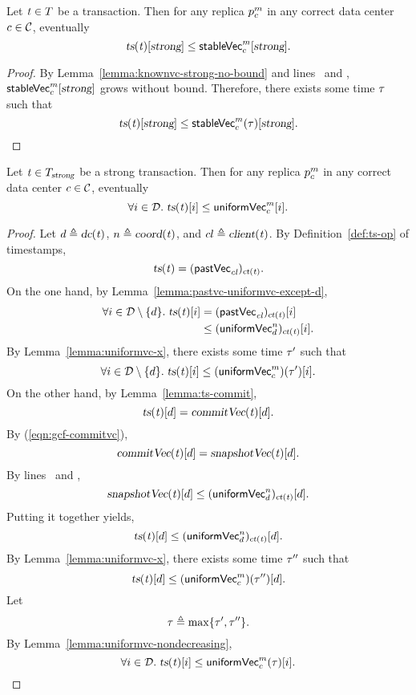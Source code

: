 \begin{applemma} \label{lemma:uniformity-strong}
  Let $\mathit{t} \in T$ be a transaction.
  Then for any replica $p^{m}_{c}$
  in any correct data center $c \in \mathcal{C}$, eventually
  \[
    \textsl{ts}(\mathit{t})[\textsl{strong}] \le {\sf stableVec}^{m}_{c}[\textsl{strong}].
  \]
\end{applemma}

\begin{proof} \label{proof:uniformity-strong}
  By Lemma~\ref{lemma:knownvc-strong-no-bound}
  and lines~\code{\ref{alg:unistore-clock}}{\ref{line:bcast-call-knownvclocal}}
  and \code{\ref{alg:unistore-clock}}{\ref{line:knownvclocal-stablevc-strong}},
  ${\sf stableVec}^{m}_{c}[\textsl{strong}]$ grows without bound.
  Therefore, there exists some time $\tau$ such that
  \[
    \textsl{ts}(\mathit{t})[\textsl{strong}] \le {\sf stableVec}^{m}_{c}(\tau)[\textsl{strong}].
  \]
\end{proof}

\begin{applemma} \label{lemma:uniformity-strongtx-i}
  Let $\mathit{t} \in T_{\textsl{strong}}$ be a strong transaction.
  Then for any replica $p^{m}_{c}$
  in any correct data center $c \in \mathcal{C}$, eventually
  \[
    \forall i \in \mathcal{D}.\; \textsl{ts}(\mathit{t})[i] \le {\sf uniformVec}^{m}_{c}[i].
  \]
\end{applemma}

\begin{proof} \label{proof:uniformity-strongtx-i}
  Let $d \triangleq \textsl{dc}(\mathit{t})$,
  $n \triangleq \textsl{coord}(\mathit{t})$, and $cl \triangleq \textsl{client}(\mathit{t})$.
  By Definition~\ref{def:ts-op} of timestamps,
  \[
    \textsl{ts}(\mathit{t}) = ({\sf pastVec}_{\mathit{cl}})_{\textsl{ct}(\mathit{t})}.
  \]
  On the one hand, by Lemma~\ref{lemma:pastvc-uniformvc-except-d},
  \begin{align*}
    \forall i \in \mathcal{D} \setminus \{d\}.\;
      \textsl{ts}(\mathit{t})[i] &= ({\sf pastVec}_{\mathit{cl}})_{\textsl{ct}(\mathit{t})}[i] \\
      &\le ({\sf uniformVec}^{n}_{d})_{\textsl{ct}(\mathit{t})}[i].
  \end{align*}
  By Lemma~\ref{lemma:uniformvc-x},
  there exists some time $\tau'$ such that
  \[
    \forall i \in \mathcal{D} \setminus \{d\}.\;
      \textsl{ts}(\mathit{t})[i] \le ({\sf uniformVec}^{m}_{c})(\tau')[i].
  \]
  On the other hand, by Lemma~\ref{lemma:ts-commit},
  \[
    \textsl{ts}(\mathit{t})[d] = \textsl{commitVec}(\mathit{t})[d].
  \]
  By (\ref{eqn:gcf-commitvc}),
  \[
    \textsl{commitVec}(\mathit{t})[d] = \textsl{snapshotVec}(\mathit{t})[d].
  \]
  By lines~\code{\ref{alg:unistore-strong-commit}}{\ref{line:commitstrong-call-uniformbarrier}}
  and \code{\ref{alg:unistore-replica}}{\ref{line:uniformbarrier-wait-uniformvc-d}},
  \[
    \textsl{snapshotVec}(\mathit{t})[d] \le ({\sf uniformVec}^{n}_{d})_{\textsl{ct}(\mathit{t})}[d].
  \]
  Putting it together yields,
  \[
    \textsl{ts}(\mathit{t})[d] \le ({\sf uniformVec}^{n}_{d})_{\textsl{ct}(\mathit{t})}[d].
  \]
  By Lemma~\ref{lemma:uniformvc-x},
  there exists some time $\tau''$ such that
  \[
    \textsl{ts}(\mathit{t})[d] \le ({\sf uniformVec}^{m}_{c})(\tau'')[d].
  \]
  Let
  \[
    \tau \triangleq \max\{\tau', \tau''\}.
  \]
  By Lemma~\ref{lemma:uniformvc-nondecreasing},
  \[
    \forall i \in \mathcal{D}.\; \textsl{ts}(\mathit{t})[i] \le {\sf uniformVec}^{m}_{c}(\tau)[i].
  \]
\end{proof}
